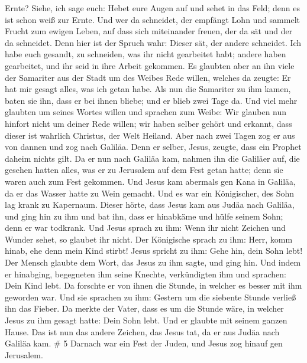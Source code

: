 Ernte? Siehe, ich sage euch: Hebet eure Augen auf und sehet in das Feld;
denn es ist schon weiß zur Ernte.  Und wer da schneidet,
der empfängt Lohn und sammelt Frucht zum ewigen Leben, auf dass sich
miteinander freuen, der da sät und der da schneidet.  Denn
hier ist der Spruch wahr: Dieser sät, der andere schneidet.
 Ich habe euch gesandt, zu schneiden, was ihr nicht
gearbeitet habt; andere haben gearbeitet, und ihr seid in ihre Arbeit
gekommen.  Es glaubten aber an ihn viele der Samariter aus
der Stadt um des Weibes Rede willen, welches da zeugte: Er hat mir
gesagt alles, was ich getan habe.  Als nun die Samariter zu
ihm kamen, baten sie ihn, dass er bei ihnen bliebe; und er blieb zwei
Tage da.  Und viel mehr glaubten um seines Wortes willen
 und sprachen zum Weibe: Wir glauben nun hinfort nicht um
deiner Rede willen; wir haben selber gehört und erkannt, dass dieser ist
wahrlich Christus, der Welt Heiland.  Aber nach zwei Tagen
zog er aus von dannen und zog nach Galiläa.  Denn er
selber, Jesus, zeugte, dass ein Prophet daheim nichts gilt.
 Da er nun nach Galiläa kam, nahmen ihn die Galiläer auf,
die gesehen hatten alles, was er zu Jerusalem auf dem Fest getan hatte;
denn sie waren auch zum Fest gekommen.  Und Jesus kam
abermals gen Kana in Galiläa, da er das Wasser hatte zu Wein gemacht.
 Und es war ein Königischer, des Sohn lag krank zu
Kapernaum. Dieser hörte, dass Jesus kam aus Judäa nach Galiläa, und ging
hin zu ihm und bat ihn, dass er hinabkäme und hülfe seinem Sohn; denn er
war todkrank.  Und Jesus sprach zu ihm: Wenn ihr nicht
Zeichen und Wunder sehet, so glaubet ihr nicht.  Der
Königische sprach zu ihm: Herr, komm hinab, ehe denn mein Kind stirbt!
 Jesus spricht zu ihm: Gehe hin, dein Sohn lebt! Der Mensch
glaubte dem Wort, das Jesus zu ihm sagte, und ging hin. 
Und indem er hinabging, begegneten ihm seine Knechte, verkündigten ihm
und sprachen: Dein Kind lebt.  Da forschte er von ihnen die
Stunde, in welcher es besser mit ihm geworden war. Und sie sprachen zu
ihm: Gestern um die siebente Stunde verließ ihn das Fieber.
 Da merkte der Vater, dass es um die Stunde wäre, in
welcher Jesus zu ihm gesagt hatte: Dein Sohn lebt. Und er glaubte mit
seinem ganzen Hause.  Das ist nun das andere Zeichen, das
Jesus tat, da er aus Judäa nach Galiläa kam. \# 5  Darnach
war ein Fest der Juden, und Jesus zog hinauf gen Jerusalem. 

